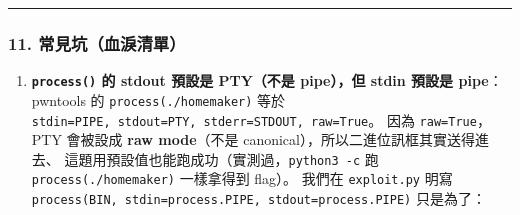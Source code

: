 \documentclass[10pt,a4paper]{article}
\providecommand{\tightlist}{%
  \setlength{\itemsep}{0pt}\setlength{\parskip}{0pt}}
\begin{document}
\begin{center}\rule{0.5\linewidth}{0.5pt}\end{center}

\subsubsection{11.
常見坑（血淚清單）}\label{ux5e38ux898bux5751ux8840ux6ddaux6e05ux55ae}

\begin{enumerate}
\def\labelenumi{\arabic{enumi}.}
\tightlist
\item
  \textbf{\texttt{process()} 的 stdout 預設是 PTY（不是 pipe），但 stdin
  預設是 pipe}： pwntools 的
  \texttt{process(\textquotesingle{}\allowbreak{}./\allowbreak{}homemaker\textquotesingle{}\allowbreak{})} 等於
  \texttt{stdin=PIPE,\allowbreak{}\ \allowbreak{}stdout=PTY,\allowbreak{}\ \allowbreak{}stderr=STDOUT,\allowbreak{}\ \allowbreak{}raw=True}。 因為
  \texttt{raw=True}，PTY 會被設成 \textbf{raw mode}（不是
  canonical），所以二進位訊框其實送得進去、
  這題用預設值也能跑成功（實測過，\texttt{python3\ \allowbreak{}-\allowbreak{}c} 跑
  \texttt{process(\textquotesingle{}\allowbreak{}./\allowbreak{}homemaker\textquotesingle{}\allowbreak{})}
  一樣拿得到 flag）。 我們在 \texttt{exploit.\allowbreak{}py} 明寫
  \texttt{process(BIN,\allowbreak{}\ \allowbreak{}stdin=process.\allowbreak{}PIPE,\allowbreak{}\ \allowbreak{}stdout=process.\allowbreak{}PIPE)}
  只是為了：


\end{enumerate}
\end{document}
